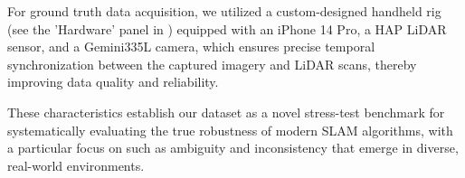 For ground truth data acquisition, we utilized a custom-designed handheld rig (see the 'Hardware' panel in ) equipped with an iPhone 14 Pro, a HAP LiDAR sensor, and a Gemini335L camera, which ensures precise temporal synchronization between the captured imagery and LiDAR scans, thereby improving data quality and reliability.

These characteristics establish our dataset as a novel stress-test benchmark for systematically evaluating the true robustness of modern SLAM algorithms, with a particular focus on  such as ambiguity and inconsistency that emerge in diverse, real-world environments.
